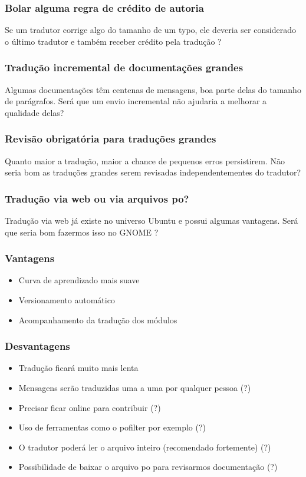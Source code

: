 \documentclass{beamer}
\begin{document}
\begin{frame}
    \frametitle{Bolar alguma regra de crédito de autoria}
    Se um tradutor corrige algo do tamanho de um typo, ele deveria ser considerado o último tradutor e também receber crédito pela tradução ? 
\end{frame}

\begin{frame}
    \frametitle{Tradução incremental de documentações grandes}
    Algumas documentações têm centenas de mensagens, boa parte delas do tamanho de parágrafos. 
    Será que um envio incremental não ajudaria a melhorar a qualidade delas?
\end{frame}

\begin{frame}
    \frametitle{Revisão obrigatória para traduções grandes}
    Quanto maior a tradução, maior a chance de pequenos erros persistirem. 
    Não seria bom as traduções grandes serem revisadas independentementes do tradutor?
\end{frame}

\begin{frame}
    \frametitle{Tradução via web ou via arquivos po?}
    Tradução via web já existe no universo Ubuntu e possui algumas vantagens. Será que seria bom
    fazermos isso no GNOME ?
\end{frame}

\begin{frame}
  \frametitle{Vantagens}
  \begin{itemize}[<+->]
    \item Curva de aprendizado mais suave
    \item Versionamento automático
    \item Acompanhamento da tradução dos módulos
  \end{itemize}
\end{frame}

\begin{frame}
  \frametitle{Desvantagens}
  \begin{itemize}[<+->]
    \item Tradução ficará muito mais lenta
    \item Mensagens serão traduzidas uma a uma por qualquer pessoa (?)
    \item Precisar ficar online para contribuir (?)
    \item Uso de ferramentas como o pofilter por exemplo (?)
    \item O tradutor poderá ler o arquivo inteiro (recomendado fortemente) (?)
    \item Possibilidade de baixar o arquivo po para revisarmos documentação (?) 
  \end{itemize}
\end{frame}
\end{document}
